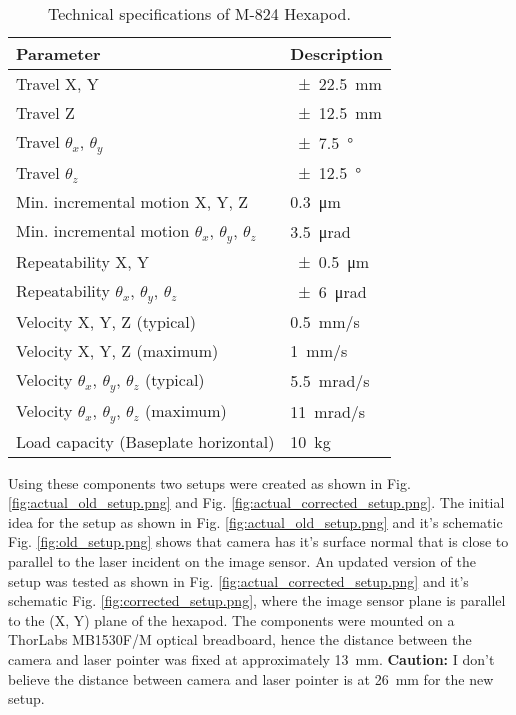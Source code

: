 \begin{table}[h]
    \centering
    \footnotesize
    \renewcommand{\arraystretch}{1.2}
    \begin{tabular}{p{7cm}p{3cm}}
        \toprule
        \textbf{Parameter} & \textbf{Description} \\
        \midrule
        Travel X, Y & \SI{\pm22.5}{\milli\meter} \\        
        Travel Z & \SI{\pm12.5}{\milli\meter} \\        
        Travel $\theta_x$, $\theta_y$ & \SI{\pm7.5}{\degree} \\        
        Travel $\theta_z$ & \SI{\pm12.5}{\degree} \\        
        Min. incremental motion X, Y, Z & \SI{0.3}{\micro\meter} \\
        Min. incremental motion $\theta_x$, $\theta_y$, $\theta_z$ & \SI{3.5}{\micro\radian} \\
        Repeatability X, Y & \SI{\pm0.5}{\micro\meter} \\
        Repeatability $\theta_x$, $\theta_y$, $\theta_z$ & \SI{\pm6}{\micro\radian} \\
        Velocity X, Y, Z (typical) & \SI{0.5}{\milli\meter/\second} \\
        Velocity X, Y, Z (maximum) & \SI{1}{\milli\meter/\second} \\
        Velocity $\theta_x$, $\theta_y$, $\theta_z$ (typical) & \SI{5.5}{\milli\radian/\second} \\
        Velocity $\theta_x$, $\theta_y$, $\theta_z$ (maximum) & \SI{11}{\milli\radian/\second} \\
        Load capacity (Baseplate horizontal) & \SI{10}{\kilo\gram} \\
        \bottomrule
    \end{tabular}
    \caption{Technical specifications of M-824 Hexapod. \cite{hexapod_manual}}
    \label{table:technical_specifications_hexapod}
\end{table}

\vspace{5mm}

\noindent Using these components two setups were created as shown in Fig. \ref{fig:actual_old_setup.png} and Fig. \ref{fig:actual_corrected_setup.png}. The initial idea for the setup as shown in Fig. \ref{fig:actual_old_setup.png} and it's schematic Fig. \ref{fig:old_setup.png} shows that camera has it's surface normal that is close to parallel to the laser incident on the image sensor. An updated version of the setup was tested as shown in Fig. \ref{fig:actual_corrected_setup.png} and it's schematic Fig. \ref{fig:corrected_setup.png}, where the image sensor plane is parallel to the (X, Y) plane of the hexapod. The components were mounted on a ThorLabs MB1530F/M optical breadboard, hence the distance between the camera and laser pointer was fixed at approximately \SI{13}{\milli\meter}. \textbf{Caution:} I don't believe the distance between camera and laser pointer is at \SI{26}{\milli\meter} for the new setup.  

